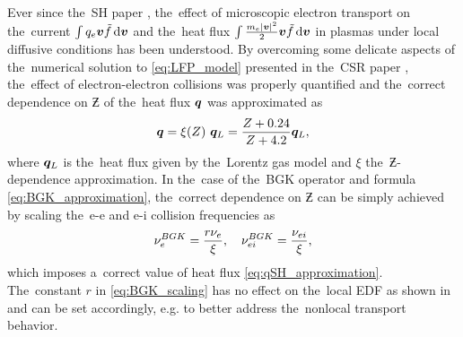 Ever since the~SH paper \cite{SpitzerHarm_PR1953}, the~effect of microscopic
electron transport on the~current $\int q_e \boldsymbol{v} \tilde{f} \, \text{d}\boldsymbol{v}$ 
and the~heat flux $\int \frac{m_e |\boldsymbol{v}|^2}{2} \boldsymbol{v} \tilde{f} \, \text{d}\boldsymbol{v}$ 
in plasmas
under local diffusive conditions has been understood. By overcoming some 
delicate aspects of the~numerical solution to \eqref{eq:LFP_model} presented 
in the~CSR paper \cite{CSR_1950}, the~effect of electron-electron collisions
was properly quantified and the~correct dependence on $\Zbar$ of the~heat flux
$\boldsymbol{q}$ was approximated as \cite{SpitzerHarm_PR1953, Epperlein_PoFB1991} 
\begin{equation}
  \boldsymbol{q} = \xi(Z)~\boldsymbol{q}_L 
  = \frac{Z + 0.24}{Z + 4.2} \boldsymbol{q}_L ,
  \label{eq:qSH_approximation}
\end{equation}
where 
$\boldsymbol{q}_L$
is the~heat flux given 
by the~Lorentz gas model \cite{Lorentz_1905} and 
$\xi$ the~$\Zbar$-dependence approximation. In the~case of the~BGK operator 
and formula \eqref{eq:BGK_approximation}, the~correct dependence on 
$\Zbar$ can be simply achieved by scaling the~e-e and e-i collision 
frequencies as
\begin{equation}
  \nu_{e}^{BGK} = \frac{r\nu_{e}}{\xi},\quad \nu_{ei}^{BGK} = \frac{\nu_{ei}}{\xi}
   ,
  \label{eq:BGK_scaling}
\end{equation}
which imposes a~correct value of heat flux \eqref{eq:qSH_approximation}. 
The~constant $r$ in \eqref{eq:BGK_scaling} has no effect on the~local EDF as
shown in  %
and can be set accordingly, e.g. to better address the~nonlocal transport 
behavior.


